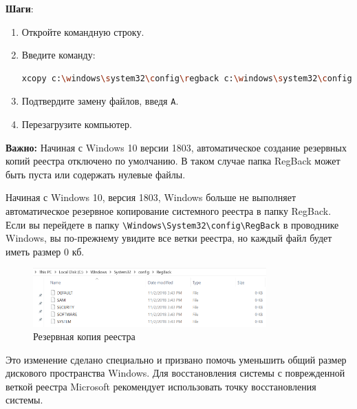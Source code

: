 \documentclass[a4paper, 14pt]{report}
\begin{document}
\begin{enumerate}
{\begin{enumerate}
{                    \textbf{Шаги}:
                    \begin{enumerate}
                        \item Откройте командную строку.
                        \item {Введите команду:
                              \begin{lstlisting}[language=bash]
xcopy c:\windows\system32\config\regback c:\windows\system32\config
                            \end{lstlisting}
                              }
                        \item Подтвердите замену файлов, введя \verb|A|.
                        \item Перезагрузите компьютер.
                    \end{enumerate}
                    \textbf{Важно:} Начиная с Windows 10 версии 1803, автоматическое создание резервных копий реестра отключено по умолчанию. В таком случае папка RegBack может быть пуста или содержать нулевые файлы.
                    \begin{tcolorbox}[colback=white!95!gray, colframe=black, title=Резервное копирование системного реестра в папку RegBack перестало выполняться в Windows 10 версии 1803]
                        Начиная с Windows 10, версия 1803, Windows больше не выполняет автоматическое резервное копирование системного реестра в папку RegBack. Если вы перейдете в папку \verb|\Windows\System32\config\RegBack| в проводнике Windows, вы по-прежнему увидите все ветки реестра, но каждый файл будет иметь размер 0 кб.
                        \begin{figure}[H]
                            \centering
                            \includegraphics[width=0.8\textwidth]{../images/regisrtry-hive-0-kb.png}
                            \caption{Резервная копия реестра}
                        \end{figure}
                        Это изменение сделано специально и призвано помочь уменьшить общий размер дискового пространства Windows. Для восстановления системы с поврежденной веткой реестра Microsoft рекомендует использовать точку восстановления системы.



\end{tcolorbox}}
\end{enumerate}}
\end{enumerate}
\end{document}
